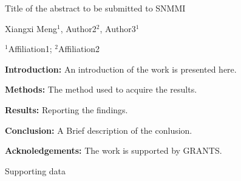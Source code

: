 \documentclass[a4paper, 11pt]{article}
\begin{document}

\begin{center}
{\large Title of the abstract to be submitted to SNMMI}

Xiangxi Meng$^1$, Author2$^2$, Author3$^1$

$^1$Affiliation1; $^2$Affiliation2
\end{center}

\vspace{-11pt}

\textbf{Introduction:} An introduction of the work is presented here.

\textbf{Methods:} The method used to acquire the results.

\textbf{Results:} Reporting the findings.

\textbf{Conclusion:} A Brief description of the conlusion.

\textbf{Acknoledgements:} The work is supported by GRANTS.

\vspace{45pt}
Supporting data
\end{document}
